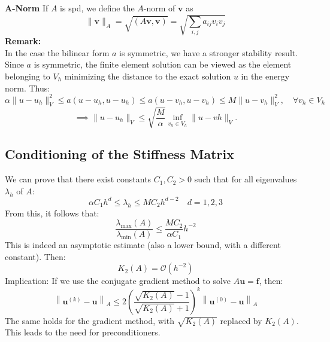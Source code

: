 \documentclass[11pt]{book}
\begin{document}
\textbf{A-Norm}
If \(A\) is spd, we define the \(A\)-norm of \(\mathbf{v}\) as
\[
\|\mathbf{v}\|_{A} =\sqrt{(A \mathbf{v}, \mathbf{v})} =\sqrt{\sum_{i, j} a_{i j} v_{i} v_{j}}
\]
\textbf{Remark:}\\
In the case the bilinear form $a$ is symmetric, we have a stronger stability result. Since $a$ is symmetric, the finite element solution can be viewed as the element belonging to $V_h$ minimizing the distance to the exact solution $u$ in the energy norm. Thus:
$$\alpha \|u-u_h\|_V ^2\leq a(u-u_h,u-u_h) \leq a(u-v_h,u-v_h) \leq M \|u-v_h \|_V^2, \quad \forall v_h \in V_h $$
$$\implies \|u-u_h\|_V \leq \sqrt{\frac{M}{\alpha}} \inf_{v_h \in V_h} \|u-vh\|_V.$$

\subsection*{Conditioning of the Stiffness Matrix}
We can prove that there exist constants $C_{1}, C_{2}>0$ such that for all eigenvalues $\lambda_{h}$ of $A$:
$$
\alpha C_{1} h^{d} \leq \lambda_{h} \leq M C_{2} h^{d-2} \quad d=1,2,3
$$
From this, it follows that:
$$
\frac{\lambda_{\max }(A)}{\lambda_{\min }(A)} \leq \frac{M C_{2}}{\alpha C_{1}} h^{-2}
$$
This is indeed an asymptotic estimate (also a lower bound, with a different constant). Then:
$$
K_{2}(A)=\mathcal{O}\left(h^{-2}\right)
$$
Implication: If we use the conjugate gradient method to solve $A \mathbf{u}=\mathbf{f}$, then:
$$
\left\|\mathbf{u}^{(k)}-\mathbf{u}\right\|_{A} \leq 2\left(\frac{\sqrt{K_{2}(A)}-1}{\sqrt{K_{2}(A)}+1}\right)^{k}\left\|\mathbf{u}^{(0)}-\mathbf{u}\right\|_{A}
$$
The same holds for the gradient method, with $\sqrt{K_{2}(A)}$ replaced by $K_{2}(A)$.
This leads to the need for preconditioners.
\end{document}
